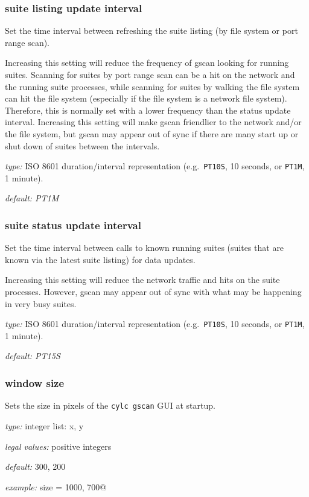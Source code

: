 \subsubsection{suite listing update interval}

Set the time interval between refreshing the suite listing (by file system or
port range scan).

Increasing this setting will reduce the frequency of gscan looking for running
suites. Scanning for suites by port range scan can be a hit on the network and
the running suite processes, while scanning for suites by walking the file
system can hit the file system (especially if the file system is a network file
system). Therefore, this is normally set with a lower frequency than the status
update interval. Increasing this setting will make gscan friendlier to the
network and/or the file system, but gscan may appear out of sync if there are
many start up or shut down of suites between the intervals.

\begin{myitemize}
\item {\em type:} ISO 8601 duration/interval representation (e.g.\ 
\lstinline=PT10S=, 10 seconds, or \lstinline=PT1M=, 1 minute).
\item {\em default: PT1M}
\end{myitemize}

\subsubsection{suite status update interval}

Set the time interval between calls to known running suites (suites that are
known via the latest suite listing) for data updates.

Increasing this setting will reduce the network traffic and hits on the suite
processes. However, gscan may appear out of sync with what may be happening
in very busy suites.

\begin{myitemize}
\item {\em type:} ISO 8601 duration/interval representation (e.g.\ 
\lstinline=PT10S=, 10 seconds, or \lstinline=PT1M=, 1 minute).
\item {\em default: PT15S}
\end{myitemize}

\subsubsection{window size}

Sets the size in pixels of the \lstinline=cylc gscan= GUI at startup.

\begin{myitemize}
    \item {\em type:} integer list: x, y
    \item {\em legal values:} positive integers
    \item {\em default:} 300, 200
    \item {\em example:} \lstinline@window size = 1000, 700@
\end{myitemize}
